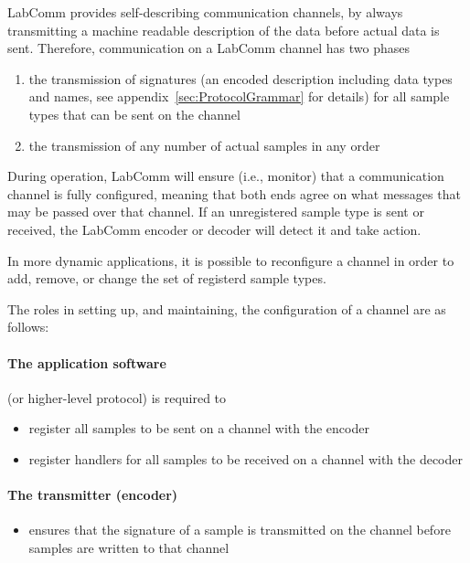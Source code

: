 \documentclass[a4paper]{article}
\begin{document}
LabComm provides self-describing communication channels, by always transmitting
a machine readable description of the data before actual data is sent.
Therefore, communication on a LabComm channel has two phases

\begin{enumerate}
\item the transmission of signatures (an encoded description including data
types and names, see appendix~\ref{sec:ProtocolGrammar} for details) for all sample types
that can be sent on the channel
\item the transmission of any number of actual samples in any order
\end{enumerate}

During operation, LabComm will ensure (i.e., monitor) that a communication
channel is fully configured, meaning that both ends agree on what messages that
may be passed over that channel.  If an unregistered sample type is sent or
received, the LabComm encoder or decoder will detect it and take action.

In more dynamic applications, it is possible to reconfigure a channel in order to add,
remove, or change the set of registerd sample types.

The roles in setting up, and maintaining, the configuration of a channel are as follows:

\paragraph{The application software} (or higher-level protocol) is required to

\begin{itemize}
\item register all samples to be sent on a channel with the encoder
\item register handlers for all samples to be received  on a channel with the decoder
\end{itemize}

\paragraph{The transmitter (encoder)}

\begin{itemize}
 \item ensures that the signature of a sample is transmitted on the channel before samples are 
       written to that channel
\end{itemize}
\end{document}
